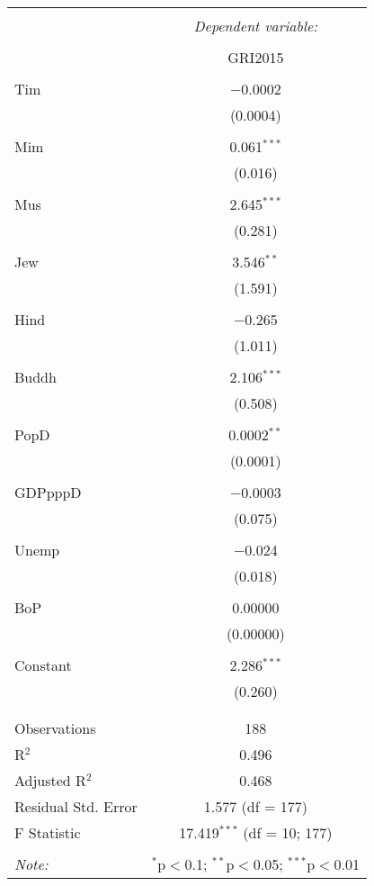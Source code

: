\documentclass[12pt,english]{article}
\begin{document}
\begin{table}[!htbp] \centering 
  \caption{} 
  \label{tab1} 
\begin{tabular}{@{\extracolsep{5pt}}lc} 
\\[-1.8ex]\hline 
\hline \\[-1.8ex] 
 & \multicolumn{1}{c}{\textit{Dependent variable:}} \\ 
\cline{2-2} 
\\[-1.8ex] & GRI2015 \\ 
\hline \\[-1.8ex] 
 Tim & $-$0.0002 \\ 
  & (0.0004) \\ 
  & \\ 
 Mim & 0.061$^{***}$ \\ 
  & (0.016) \\ 
  & \\ 
 Mus & 2.645$^{***}$ \\ 
  & (0.281) \\ 
  & \\ 
 Jew & 3.546$^{**}$ \\ 
  & (1.591) \\ 
  & \\ 
 Hind & $-$0.265 \\ 
  & (1.011) \\ 
  & \\ 
 Buddh & 2.106$^{***}$ \\ 
  & (0.508) \\ 
  & \\ 
 PopD & 0.0002$^{**}$ \\ 
  & (0.0001) \\ 
  & \\ 
 GDPpppD & $-$0.0003 \\ 
  & (0.075) \\ 
  & \\ 
 Unemp & $-$0.024 \\ 
  & (0.018) \\ 
  & \\ 
 BoP & 0.00000 \\ 
  & (0.00000) \\ 
  & \\ 
 Constant & 2.286$^{***}$ \\ 
  & (0.260) \\ 
  & \\ 
\hline \\[-1.8ex] 
Observations & 188 \\ 
R$^{2}$ & 0.496 \\ 
Adjusted R$^{2}$ & 0.468 \\ 
Residual Std. Error & 1.577 (df = 177) \\ 
F Statistic & 17.419$^{***}$ (df = 10; 177) \\ 
\hline 
\hline \\[-1.8ex] 
\textit{Note:}  & \multicolumn{1}{r}{$^{*}$p$<$0.1; $^{**}$p$<$0.05; $^{***}$p$<$0.01} \\ 
\end{tabular} 
\end{table} 
\end{document}
